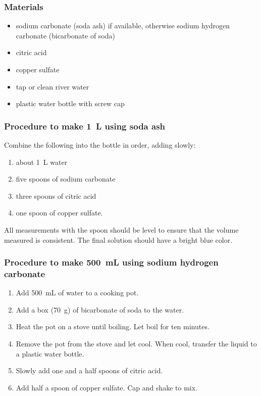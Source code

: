 \subsubsection{Materials}
\begin{itemize}
\item{sodium carbonate (soda ash) if available, otherwise sodium hydrogen carbonate (bicarbonate of soda)}
\item{citric acid}
\item{copper sulfate}
\item{tap or clean river water}
\item{plastic water bottle with screw cap}
\end{itemize}

\subsubsection{Procedure to make 1~L using soda ash}
Combine the following into the bottle in order, adding slowly:
\begin{enumerate}
\item{about 1~L water}
\item{five spoons of sodium carbonate}
\item{three spoons of citric acid}
\item{one spoon of copper sulfate.}
\end{enumerate}

All measurements with the spoon should be level to ensure that the volume measured is consistent. The final solution should have a bright blue color.

\subsubsection{Procedure to make 500~mL using sodium hydrogen carbonate}
\begin{enumerate}
\item{Add 500~mL of water to a cooking pot.}
\item{Add a box (70~g) of bicarbonate of soda to the water.}
\item{Heat the pot on a stove until boiling. Let boil for ten minutes.}
\item{Remove the pot from the stove and let cool. When cool, transfer the liquid to a plastic water bottle.}
\item{Slowly add one and a half spoons of citric acid.}
\item{Add half a spoon of copper sulfate. Cap and shake to mix.}
\end{enumerate}

